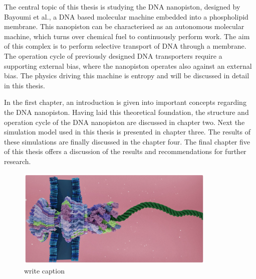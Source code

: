 The central topic of this thesis is studying the DNA nanopiston, designed by Bayoumi et
al., a DNA based molecular machine embedded into a phospholipid membrane. This nanopiston
can
be characterised as an autonomous molecular machine, which turns over chemical fuel to
continuously perform work. The aim of this complex is to perform selective transport of
DNA through a membrane. The operation cycle of previously designed DNA transporters
require a supporting external bias, where the nanopiston operates also against an
external bias. The physics driving this machine is entropy and will be discussed in
detail in this thesis.

In the first chapter, an introduction is given into important concepts regarding the
DNA nanopiston. Having laid this theoretical foundation, the structure and operation
cycle of the DNA nanopiston are discussed in chapter two. Next the simulation model used
in this thesis is presented in chapter three. The results of these simulations are
finally discussed in the chapter four. The final chapter five of this thesis offers a
discussion of the results and recommendations for further research.

\begin{figure}[ht]
\begin{center}
  \includegraphics[width=0.85\textwidth]{Figures/flagella2.png}
  \caption{write caption}
\end{center}
\end{figure}
